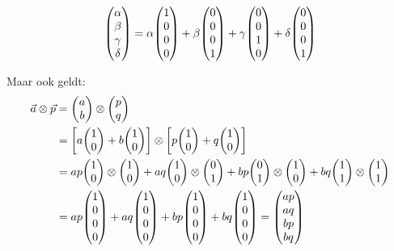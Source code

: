 \documentclass[../main.tex]{subfiles}
\begin{document}
\begin{mdframed}[style=wiskader,frametitle={Matrixen}]
\[\mqty(\alpha\\ \beta\\ \gamma\\ \delta)=\alpha\mqty(1\\0\\0\\0) + \beta\mqty(0\\0\\0\\1) +\gamma\mqty(0\\0\\1\\0) +\delta\mqty(0\\0\\0\\1) \]

Maar ook geldt:
\begin{align*}
\vect{a} \otimes \vect{p} & =\mqty(a\\b) \otimes \mqty(p\\q)\\
& =\left[a\mqty(1\\0) + b\mqty(1\\0)\right] \otimes \left[p\mqty(1\\0) + q\mqty(1\\0)\right]\\
& = ap\mqty(1\\0) \otimes \mqty(1\\0) + 
    aq\mqty(1\\0) \otimes \mqty(0\\1) + 
    bp\mqty(0\\1) \otimes \mqty(1\\0) + 
    bq\mqty(1\\1) \otimes \mqty(1\\1)\\
& = ap\mqty(1\\0\\0\\0) + 
    aq\mqty(1\\0\\0\\0) + 
    bp\mqty(1\\0\\0\\0) + 
    bq\mqty(1\\0\\0\\0) = \mqty(ap\\aq\\bp\\bq)
\end{align*}


\end{mdframed}
\end{document}
